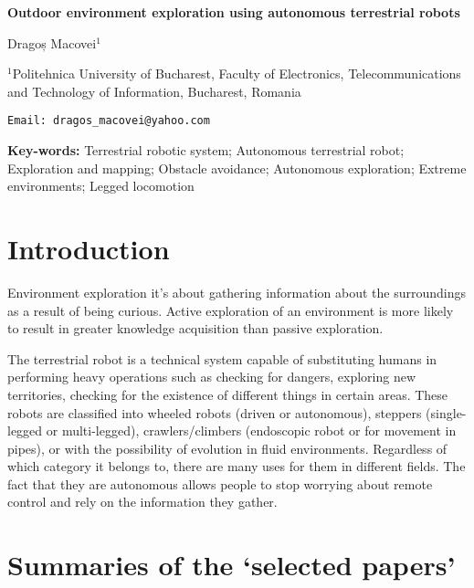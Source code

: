 \documentclass[12pt, twoside]{article}
\begin{document}
	\begin{center}
	\begin{huge}
	
	\textbf{Outdoor environment exploration using autonomous terrestrial robots}
	\end{huge}
	
	\begin{large}
		Dragoș Macovei$^1$
	\end{large}
	
	
	\small {$^1$Politehnica University of Bucharest, Faculty of Electronics, Telecommunications and Technology of Information, Bucharest, Romania}
	
	\texttt {Email: dragos\_macovei@yahoo.com}
	
	\textbf{Key-words:} Terrestrial robotic system; Autonomous terrestrial robot; Exploration and mapping; Obstacle avoidance; Autonomous exploration; Extreme environments; Legged locomotion

	\end{center}

\section{Introduction}

Environment exploration it’s about gathering information about the surroundings as a result of being curious. Active exploration of an environment is more likely to result in greater knowledge acquisition than passive exploration.

The terrestrial robot is a technical system capable of substituting humans in performing heavy operations such as checking for dangers, exploring new territories, checking for the existence of different things in certain areas. These robots are classified into wheeled robots (driven or autonomous), steppers (single-legged or multi-legged), crawlers/climbers (endoscopic robot or for movement in pipes), or with the possibility of evolution in fluid environments. Regardless of which category it belongs to, there are many uses for them in different fields. The fact that they are autonomous allows people to stop worrying about remote control and rely on the information they gather.


\section{Summaries of the ‘selected papers’}
\end{document}
